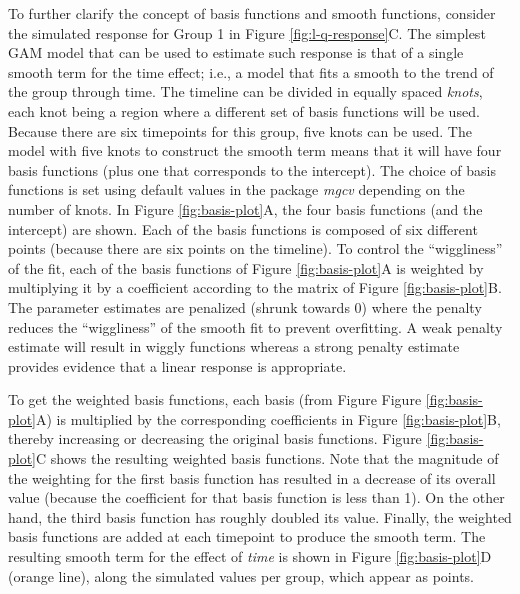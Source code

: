 \documentclass[Royal,times,doublespace,sagev]{sagej}
\begin{document}
To further clarify the concept of basis functions and smooth functions, consider the simulated response for Group 1 in Figure \ref{fig:l-q-response}C. The simplest GAM model that can be used to estimate such response is that of a single smooth term for the time effect; i.e., a model that fits a smooth to the trend of the group through time. The timeline can be divided in equally spaced \emph{knots}, each knot being a region where a different set of basis functions will be used. Because there are six timepoints for this group, five knots can be used. The model with five knots to construct the smooth term means that it will have four basis functions (plus one that corresponds to the intercept). The choice of basis functions is set using default values in the package \emph{mgcv} depending on the number of knots. In Figure \ref{fig:basis-plot}A, the four basis functions (and the intercept) are shown. Each of the basis functions is composed of six different points (because there are six points on the timeline). To control the ``wiggliness'' of the fit, each of the basis functions of Figure \ref{fig:basis-plot}A is weighted by multiplying it by a coefficient according to the matrix of Figure \ref{fig:basis-plot}B. The parameter estimates are penalized (shrunk towards 0) where the penalty reduces the ``wiggliness'' of the smooth fit to prevent overfitting. A weak penalty estimate will result in wiggly functions whereas a strong penalty estimate provides evidence that a linear response is appropriate.

To get the weighted basis functions, each basis (from Figure Figure \ref{fig:basis-plot}A) is multiplied by the corresponding coefficients in Figure \ref{fig:basis-plot}B, thereby increasing or decreasing the original basis functions. Figure \ref{fig:basis-plot}C shows the resulting weighted basis functions. Note that the magnitude of the weighting for the first basis function has resulted in a decrease of its overall value (because the coefficient for that basis function is less than 1). On the other hand, the third basis function has roughly doubled its value. Finally, the weighted basis functions are added at each timepoint to produce the smooth term. The resulting smooth term for the effect of \emph{time} is shown in Figure \ref{fig:basis-plot}D (orange line), along the simulated values per group, which appear as points.
\end{document}
